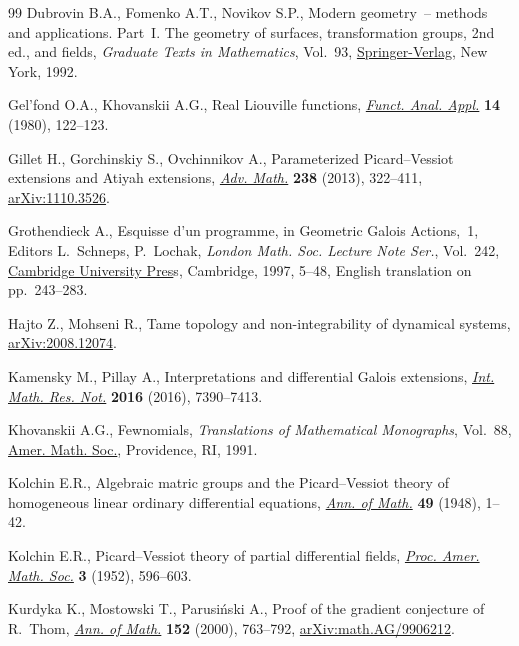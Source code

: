 \begin{thebibliography}{99}
Dubrovin B.A., Fomenko A.T., Novikov S.P., Modern geometry~-- methods and
 applications. {P}art~{I}. The geometry of surfaces, transformation groups, 2nd ed.,
 and fields, \textit{Graduate Texts in Mathematics}, Vol.~93,
 \href{https://doi.org/10.1007/978-1-4612-4398-4}{Springer-Verlag}, New York, 1992.

Gel'fond O.A., Khovanskii A.G., Real {L}iouville functions, \href{https://doi.org/10.1007/BF01086557}{\textit{Funct.
 Anal. Appl.}} \textbf{14} (1980), 122--123.

Gillet H., Gorchinskiy S., Ovchinnikov A., Parameterized {P}icard--{V}essiot
 extensions and {A}tiyah extensions, \href{https://doi.org/10.1016/j.aim.2013.02.006}{\textit{Adv. Math.}} \textbf{238} (2013),
 322--411, \href{https://arxiv.org/abs/1110.3526}{arXiv:1110.3526}.

Grothendieck A., Esquisse d'un programme, in Geometric {G}alois Actions,~1,
 Editors L.~Schneps, P.~Lochak, \textit{London Math. Soc. Lecture Note Ser.},
 Vol.~242, \href{https://doi.org/10.1017/CBO9780511758874.003}{Cambridge University Pres}s, Cambridge, 1997, 5--48, {E}nglish translation on pp.~243--283.

Hajto Z., Mohseni R., Tame topology and non-integrability of dynamical systems,
 \href{https://arxiv.org/abs/2008.12074}{arXiv:2008.12074}.

Kamensky M., Pillay A., Interpretations and differential {G}alois extensions,
 \href{https://doi.org/10.1093/imrn/rnw019}{\textit{Int. Math. Res. Not.}} \textbf{2016} (2016), 7390--7413.

Khovanskii A.G., Fewnomials, \textit{Translations of Mathematical Monographs},
 Vol.~88, \href{https://doi.org/10.1090/mmono/088}{Amer. Math. Soc.}, Providence, RI, 1991.

Kolchin E.R., Algebraic matric groups and the {P}icard--{V}essiot theory of
 homogeneous linear ordinary differential equations, \href{https://doi.org/10.2307/1969111}{\textit{Ann. of Math.}}
 \textbf{49} (1948), 1--42.

Kolchin E.R., Picard--{V}essiot theory of partial differential fields,
 \href{https://doi.org/10.2307/2032594}{\textit{Proc. Amer. Math. Soc.}} \textbf{3} (1952), 596--603.

Kurdyka K., Mostowski T., Parusi\'nski A., Proof of the gradient conjecture of
 {R}.~{T}hom, \href{https://doi.org/10.2307/2661354}{\textit{Ann. of Math.}} \textbf{152} (2000), 763--792,
 \href{https://arxiv.org/abs/math.AG/9906212}{arXiv:math.AG/9906212}.


\end{thebibliography}
